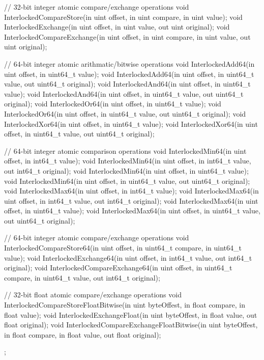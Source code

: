 \begin{HLSL}
{   // 32-bit integer atomic compare/exchange operations
   void InterlockedCompareStore(in uint offset, in uint compare, in uint value);
   void InterlockedExchange(in uint offset, in uint value, out uint original);
   void InterlockedCompareExchange(in uint offset, in uint compare, in uint value,
                                    out uint original);

   // 64-bit integer atomic arithmatic/bitwise operations
   void InterlockedAdd64(in uint offset, in uint64_t value);
   void InterlockedAdd64(in uint offset, in uint64_t value, out uint64_t original);
   void InterlockedAnd64(in uint offset, in uint64_t value);
   void InterlockedAnd64(in uint offset, in uint64_t value, out uint64_t original);
   void InterlockedOr64(in uint offset, in uint64_t value);
   void InterlockedOr64(in uint offset, in uint64_t value, out uint64_t original);
   void InterlockedXor64(in uint offset, in uint64_t value);
   void InterlockedXor64(in uint offset, in uint64_t value, out uint64_t original);

   // 64-bit integer atomic comparison operations
   void InterlockedMin64(in uint offset, in int64_t value);
   void InterlockedMin64(in uint offset, in int64_t value, out int64_t original);
   void InterlockedMin64(in uint offset, in uint64_t value);
   void InterlockedMin64(in uint offset, in uint64_t value, out uint64_t original);
   void InterlockedMax64(in uint offset, in int64_t value);
   void InterlockedMax64(in uint offset, in int64_t value, out int64_t original);
   void InterlockedMax64(in uint offset, in uint64_t value);
   void InterlockedMax64(in uint offset, in uint64_t value, out uint64_t original);

   // 64-bit integer atomic compare/exchange operations
   void InterlockedCompareStore64(in uint offset, in uint64_t compare,
                                   in uint64_t value);
   void InterlockedExchange64(in uint offset, in int64_t value,
                               out int64_t original);
   void InterlockedCompareExchange64(in uint offset, in uint64_t compare,
                                      in uint64_t value, out int64_t original);

   // 32-bit float atomic compare/exchange operations
   void InterlockedCompareStoreFloatBitwise(in uint byteOffest,
                                             in float compare, in float value);
   void InterlockedExchangeFloat(in uint byteOffest, in float value,
                                  out float original);
   void InterlockedCompareExchangeFloatBitwise(in uint byteOffest,
                                                in float compare,
                                                in float value,
                                                out float original);
};
\end{HLSL}

